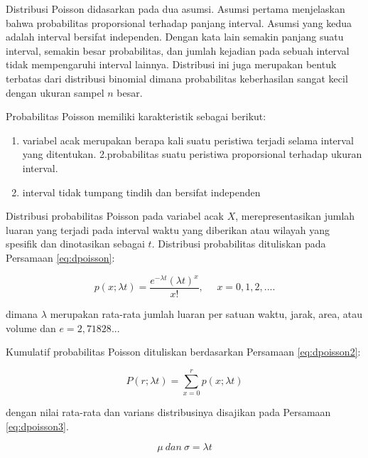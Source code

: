 \documentclass[]{book}
\providecommand{\tightlist}{%
  \setlength{\itemsep}{0pt}\setlength{\parskip}{0pt}}
\begin{document}
Distribusi Poisson didasarkan pada dua asumsi. Asumsi pertama
menjelaskan bahwa probabilitas proporsional terhadap panjang interval.
Asumsi yang kedua adalah interval bersifat independen. Dengan kata lain
semakin panjang suatu interval, semakin besar probabilitas, dan jumlah
kejadian pada sebuah interval tidak mempengaruhi interval lainnya.
Distribusi ini juga merupakan bentuk terbatas dari distribusi binomial
dimana probabilitas keberhasilan sangat kecil dengan ukuran sampel \(n\)
besar.

Probabilitas Poisson memiliki karakteristik sebagai berikut:

\begin{enumerate}
\def\labelenumi{\arabic{enumi}.}
\tightlist
\item
  variabel acak merupakan berapa kali suatu peristiwa terjadi selama
  interval yang ditentukan. 2.probabilitas suatu peristiwa proporsional
  terhadap ukuran interval.
\item
  interval tidak tumpang tindih dan bersifat independen
\end{enumerate}

Distribusi probabilitas Poisson pada variabel acak \(X\),
merepresentasikan jumlah luaran yang terjadi pada interval waktu yang
diberikan atau wilayah yang spesifik dan dinotasikan sebagai \(t\).
Distribusi probabilitas dituliskan pada Persamaan \eqref{eq:dpoisson}:

\begin{equation}
   p\left(x;\lambda t\right)=\frac{e^{-\lambda t}\left(\lambda t\right)^x}{x!},\ \ \ \ \ \ x=0,1,2,....
  \label{eq:dpoisson}
\end{equation}

dimana \(\lambda\) merupakan rata-rata jumlah luaran per satuan waktu,
jarak, area, atau volume dan \(e=2,71828...\)

Kumulatif probabilitas Poisson dituliskan berdasarkan Persamaan
\eqref{eq:dpoisson2}:

\begin{equation}
   P\left(r;\lambda t\right)=\sum_{x=0}^rp\left(x;\lambda t\right)
  \label{eq:dpoisson2}
\end{equation}

dengan nilai rata-rata dan varians distribusinya disajikan pada
Persamaan \eqref{eq:dpoisson3}.

\begin{equation}
   \mu\ dan\ \sigma=\lambda t
  \label{eq:dpoisson3}
\end{equation}
\end{document}
